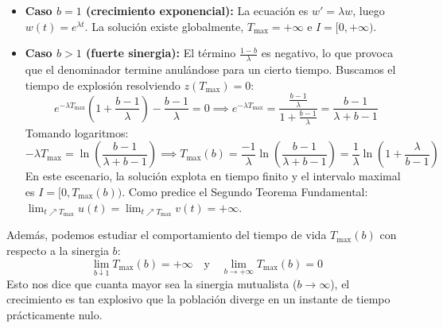 {\begin{itemize}
        \item \textbf{Caso $b = 1$ (crecimiento exponencial):}
        La ecuación es $w' = \lambda w$, luego $w(t) = e^{\lambda t}$. La solución existe globalmente, $T_{\max} = +\infty$ e $I = [0, +\infty)$.
        
        \item \textbf{Caso $b > 1$ (fuerte sinergia):}
        El término $\frac{1-b}{\lambda}$ es negativo, lo que provoca que el denominador termine anulándose para un cierto tiempo. Buscamos el tiempo de explosión resolviendo $z(T_{\max}) = 0$:
        \[
            e^{-\lambda T_{\max}} \left(1 + \frac{b-1}{\lambda}\right) - \frac{b-1}{\lambda} = 0 \implies e^{-\lambda T_{\max}} = \frac{\frac{b-1}{\lambda}}{1 + \frac{b-1}{\lambda}} = \frac{b-1}{\lambda + b - 1}
        \]
        Tomando logaritmos:
        \[
            -\lambda T_{\max} = \ln\left(\frac{b-1}{\lambda+b-1}\right) \implies T_{\max}(b) = \frac{-1}{\lambda} \ln\left(\frac{b-1}{\lambda+b-1}\right) = \frac{1}{\lambda} \ln\left(1 + \frac{\lambda}{b-1}\right)
        \]
        En este escenario, la solución explota en tiempo finito y el intervalo maximal es $I = [0, T_{\max}(b))$. Como predice el Segundo Teorema Fundamental: $\lim_{t \nearrow T_{\max}} u(t) = \lim_{t \nearrow T_{\max}} v(t) = +\infty$.
    \end{itemize}

    \vspace{0.2cm}
    Además, podemos estudiar el comportamiento del tiempo de vida $T_{\max}(b)$ con respecto a la sinergia $b$:
    \[
        \lim_{b \downarrow 1} T_{\max}(b) = +\infty \quad \text{y} \quad \lim_{b \to +\infty} T_{\max}(b) = 0
    \]
    Esto nos dice que cuanta mayor sea la sinergia mutualista ($b \to \infty$), el crecimiento es tan explosivo que la población diverge en un instante de tiempo prácticamente nulo.
    
    \begin{center}
    \end{center}
}

